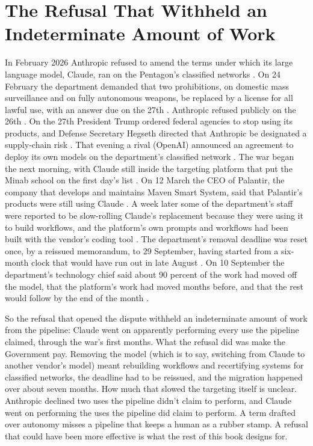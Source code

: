 \chapter{The Refusal That Withheld an Indeterminate Amount of Work}
\label{sec:2}
In February 2026 Anthropic refused to amend the terms under which its large language model, Claude, ran on the Pentagon's classified networks \autocite{cnn2026phaseout}. On 24 February the department demanded that two prohibitions, on domestic mass surveillance and on fully autonomous weapons, be replaced by a license for all lawful use, with an answer due on the 27th \autocite{defenseone2026ultimatum,volokh2026anthropiccontract}. Anthropic refused publicly on the 26th \autocite{volokh2026anthropiccontract}. On the 27th President Trump ordered federal agencies to stop using its products, and Defense Secretary Hegseth directed that Anthropic be designated a supply-chain risk \autocite{npr2026openai}. That evening a rival (OpenAI) announced an agreement to deploy its own models on the department's classified network \autocite{cnbc2026openai}. The war began the next morning, with Claude still inside the targeting platform that put the Minab school on the first day's list \autocite{crs2026iranwar,livingstone2026maven,gizmodo2026minab}. On 12 March the CEO of Palantir, the company that develops and maintains Maven Smart System, said that Palantir's products were still using Claude \autocite{cnbc2026karp}. A week later some of the department's staff were reported to be slow-rolling Claude's replacement because they were using it to build workflows, and the platform's own prompts and workflows had been built with the vendor's coding tool \autocite{militarytimes2026removal}. The department's removal deadline was reset once, by a reissued memorandum, to 29 September, having started from a six-month clock that would have run out in late August \autocite{breakingdefense2026removal}. On 10 September the department's technology chief said about 90 percent of the work had moved off the model, that the platform's work had moved months before, and that the rest would follow by the end of the month \autocite{defensescoop2026michael}.

So the refusal that opened the dispute withheld an indeterminate amount of work from the pipeline: Claude went on apparently performing every use the pipeline claimed, through the war's first months. What the refusal did was make the Government pay. Removing the model (which is to say, switching from Claude to another vendor's model) meant rebuilding workflows and recertifying systems for classified networks, the deadline had to be reissued, and the migration happened over about seven months. How much that slowed the targeting itself is unclear. Anthropic declined two uses the pipeline didn't claim to perform, and Claude went on performing the uses the pipeline did claim to perform. A term drafted over autonomy misses a pipeline that keeps a human as a rubber stamp. A refusal that could have been more effective is what the rest of this book designs for.

